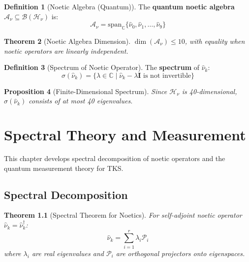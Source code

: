 \documentclass[11pt,twoside,openright]{book}
\theoremstyle{definition}
\newtheorem{definition}{Definition}[chapter]
\theoremstyle{plain}
\newtheorem{theorem}[definition]{Theorem}
\newtheorem{proposition}[definition]{Proposition}
\theoremstyle{remark}
\newcommand{\Hspace}{\mathcal{H}}
\newcommand{\qop}[1]{\hat{#1}}
\newcommand{\BoundedOp}{\mathcal{B}}         %
\newcommand{\Projector}{\mathcal{P}}         %
\newcommand{\Spectrum}{\sigma}               %
\newcommand{\vnewtwo}{\textbf{v7.2 New}}
\begin{document}
\begin{definition}[Noetic Algebra (Quantum)]
\label{def:noetic-algebra-quantum}
The \textbf{quantum noetic algebra} $\mathcal{A}_\nu \subseteq \BoundedOp(\Hspace_\nu)$ is:
\[
\mathcal{A}_\nu = \mathrm{span}_\mathbb{C}\{\qop{\nu}_0, \qop{\nu}_1, \ldots, \qop{\nu}_9\}
\]
\end{definition}

\begin{theorem}[Noetic Algebra Dimension]
\label{thm:noetic-algebra-dim}
$\dim(\mathcal{A}_\nu) \leq 10$, with equality when noetic operators are linearly independent.
\end{theorem}

\begin{definition}[Spectrum of Noetic Operator]
\label{def:noetic-spectrum}
The \textbf{spectrum} of $\qop{\nu}_k$:
\[
\Spectrum(\qop{\nu}_k) = \{\lambda \in \mathbb{C} \mid \qop{\nu}_k - \lambda \mathbf{I} \text{ is not invertible}\}
\]
\end{definition}

\begin{proposition}[Finite-Dimensional Spectrum]
\label{prop:finite-spectrum}
Since $\Hspace_\nu$ is 40-dimensional, $\Spectrum(\qop{\nu}_k)$ consists of at most 40 eigenvalues.
\end{proposition}


\chapter{Spectral Theory and Measurement}
\label{ch:spectral}

\begin{tcolorbox}[colback=blue!5!white,colframe=blue!75!black,title=\vnewtwo]
This chapter develops spectral decomposition of noetic operators and the quantum measurement theory for TKS.
\end{tcolorbox}

\section{Spectral Decomposition}

\begin{theorem}[Spectral Theorem for Noetics]
\label{thm:spectral-noetics}
For self-adjoint noetic operator $\qop{\nu}_k = \qop{\nu}_k^\dagger$:
\[
\qop{\nu}_k = \sum_{i=1}^{r} \lambda_i \Projector_i
\]
where $\lambda_i$ are real eigenvalues and $\Projector_i$ are orthogonal projectors onto eigenspaces.
\end{theorem}
\end{document}
